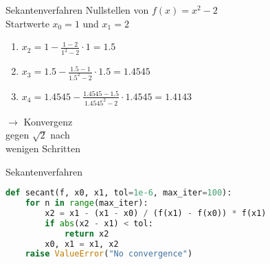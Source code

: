 \begin{example2}{Sekantenverfahren} Nullstellen von $f(x)=x^2-2$\\
Startwerte $x_0 = 1$ und $x_1 = 2$
\vspace{1mm}\\
\begin{minipage}[t]{0.65\textwidth}
    \vspace{-3mm}
    \begin{enumerate}
        \item $x_2 = 1 - \frac{1-2}{1^2-2} \cdot 1 = 1.5$
        \item $x_3 = 1.5 - \frac{1.5-1}{1.5^2-2} \cdot 1.5 = 1.4545$
        \item $x_4 = 1.4545 - \frac{1.4545-1.5}{1.4545^2-2} \cdot 1.4545 = 1.4143$
    \end{enumerate}
\end{minipage}
\hspace{2mm}
\begin{minipage}[t]{0.28\textwidth}
    $\rightarrow$ Konvergenz\\ gegen $\sqrt{2}$ nach \\wenigen Schritten
\end{minipage}
\end{example2}

\begin{examplecode}{Sekantenverfahren}
    \begin{lstlisting}[language=Python, style=basesmol]
def secant(f, x0, x1, tol=1e-6, max_iter=100):
    for n in range(max_iter):
        x2 = x1 - (x1 - x0) / (f(x1) - f(x0)) * f(x1)
        if abs(x2 - x1) < tol:
            return x2
        x0, x1 = x1, x2
    raise ValueError("No convergence")
    \end{lstlisting}
\end{examplecode}

